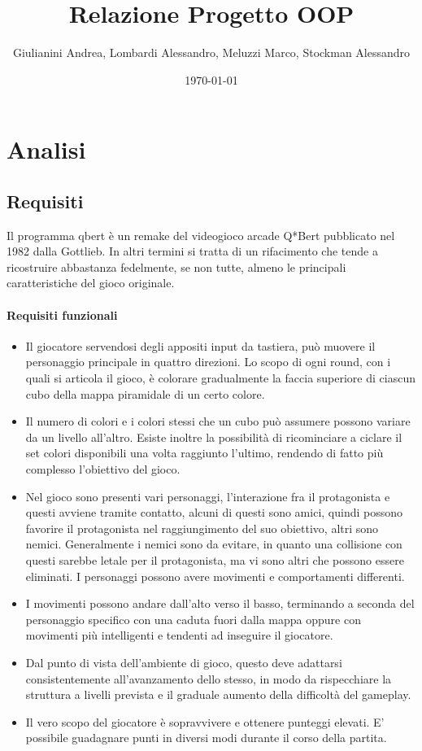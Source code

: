 \documentclass[a4paper,12pt]{report}
\title{\Huge \textbf{Relazione Progetto OOP}}
\author{Giulianini Andrea, Lombardi Alessandro, Meluzzi Marco, Stockman Alessandro}
\date{\today}
\begin{document}
 
\maketitle
\justify

\tableofcontents

\chapter{Analisi}

\section{Requisiti}

Il programma qbert è un remake del videogioco arcade Q*Bert pubblicato nel 1982 dalla  Gottlieb. In altri termini si tratta di un rifacimento che  tende a ricostruire abbastanza  fedelmente, se non tutte, almeno le principali caratteristiche del gioco originale.

\subsubsection{Requisiti funzionali}
\begin{itemize}
	\item Il giocatore servendosi degli appositi input da tastiera, può muovere il personaggio principale in quattro direzioni. Lo scopo di ogni round, con i quali si articola il gioco, è colorare gradualmente la faccia superiore di ciascun cubo della mappa piramidale di un certo colore.
	\item Il numero di colori e i colori stessi che un cubo può assumere possono variare da un livello all'altro. Esiste inoltre la possibilità di ricominciare a ciclare il set colori disponibili una volta raggiunto l'ultimo, rendendo di fatto più complesso l'obiettivo del gioco.
	\item Nel gioco sono presenti vari personaggi, l'interazione fra il protagonista e questi avviene tramite contatto, alcuni di questi sono amici, quindi possono favorire il protagonista nel raggiungimento del suo obiettivo, altri sono nemici. Generalmente i nemici sono da evitare, in quanto una collisione con questi sarebbe letale per il protagonista, ma vi sono altri che possono essere eliminati. I personaggi possono avere movimenti e comportamenti differenti.
	\item I movimenti possono andare dall'alto verso il basso, terminando a seconda del personaggio specifico con una caduta fuori dalla mappa oppure con movimenti più intelligenti e tendenti ad inseguire il giocatore.
	\item Dal punto di vista dell’ambiente di gioco, questo deve adattarsi consistentemente all’avanzamento dello stesso, in modo da rispecchiare la struttura a livelli prevista e il graduale aumento della difficoltà del gameplay.
	\item Il vero scopo del giocatore è sopravvivere e ottenere punteggi elevati. E' possibile guadagnare punti in diversi modi durante il corso della partita.
\end{itemize}
\end{document}
